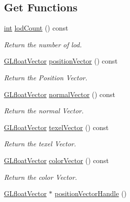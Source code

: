 \subsection*{Get Functions}
\begin{DoxyCompactItemize}
\item 
\hyperlink{ioapi_8h_a787fa3cf048117ba7123753c1e74fcd6}{int} \hyperlink{class_g_l_c___mesh_data_ae3bee82fa3ae74270bf711a1be808455}{lod\-Count} () const 
\begin{DoxyCompactList}\small\item\em Return the number of lod. \end{DoxyCompactList}\item 
\hyperlink{glc__global_8h_a9f3f0b00cd127b066c9931b9c257a046}{G\-Lfloat\-Vector} \hyperlink{class_g_l_c___mesh_data_ab22991a864c724d9f3da88791d3c8537}{position\-Vector} () const 
\begin{DoxyCompactList}\small\item\em Return the Position Vector. \end{DoxyCompactList}\item 
\hyperlink{glc__global_8h_a9f3f0b00cd127b066c9931b9c257a046}{G\-Lfloat\-Vector} \hyperlink{class_g_l_c___mesh_data_afa52d13f0cb6028755955258c4854108}{normal\-Vector} () const 
\begin{DoxyCompactList}\small\item\em Return the normal Vector. \end{DoxyCompactList}\item 
\hyperlink{glc__global_8h_a9f3f0b00cd127b066c9931b9c257a046}{G\-Lfloat\-Vector} \hyperlink{class_g_l_c___mesh_data_afcc9830adf4b5ca43cd360dba7ffa055}{texel\-Vector} () const 
\begin{DoxyCompactList}\small\item\em Return the texel Vector. \end{DoxyCompactList}\item 
\hyperlink{glc__global_8h_a9f3f0b00cd127b066c9931b9c257a046}{G\-Lfloat\-Vector} \hyperlink{class_g_l_c___mesh_data_a1a284e16034c43fbf10e79fe04c3386a}{color\-Vector} () const 
\begin{DoxyCompactList}\small\item\em Return the color Vector. \end{DoxyCompactList}\item 
\hyperlink{glc__global_8h_a9f3f0b00cd127b066c9931b9c257a046}{G\-Lfloat\-Vector} $\ast$ \hyperlink{class_g_l_c___mesh_data_a41abdb54743f2bea849bc2ff0540a2b9}{position\-Vector\-Handle} ()

\end{DoxyCompactItemize}
